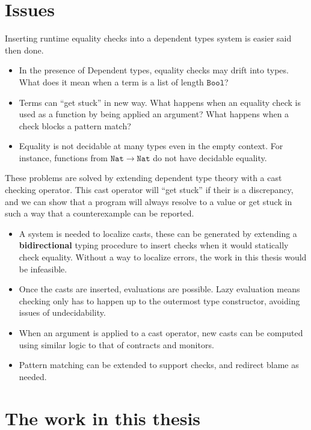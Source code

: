 \section{Issues}

Inserting runtime equality checks into a dependent types system is
easier said then done.
\begin{itemize}
\item In the presence of Dependent types, equality checks may drift into
types. What does it mean when a term is a list of length $\mathtt{Bool}$?
\item Terms can ``get stuck'' in new way. What happens when an equality
check is used as a function by being applied an argument? What happens
when a check blocks a pattern match?
\item Equality is not decidable at many types even in the empty context.
For instance, functions from $\mathtt{Nat}\rightarrow\mathtt{Nat}$
do not have decidable equality.
\end{itemize}
These problems are solved by extending dependent type theory with
a cast checking operator. This cast operator will ``get stuck''
if their is a discrepancy, and we can show that a program will always
resolve to a value or get stuck in such a way that a counterexample
can be reported.
\begin{itemize}
\item A system is needed to localize casts, these can be generated by extending
a \textbf{bidirectional} typing procedure to insert checks when it
would statically check equality. Without a way to localize errors,
the work in this thesis would be infeasible.
\item Once the casts are inserted, evaluations are possible. Lazy evaluation
means checking only has to happen up to the outermost type constructor,
avoiding issues of undecidability.
\item When an argument is applied to a cast operator, new casts can be computed
using similar logic to that of contracts and monitors\cite{10.1145/581478.581484}.
\item Pattern matching can be extended to support checks, and redirect blame
as needed. 
\end{itemize}

\section{The work in this thesis}


